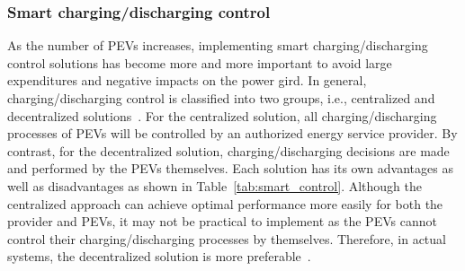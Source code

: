 \documentclass[twocolumn,10pt]{IEEEtran}
\begin{document}
\subsubsection{Smart charging/discharging control}

As the number of PEVs increases, implementing smart charging/discharging control solutions has become more and more important to avoid large expenditures and negative impacts on the power gird. In general, charging/discharging control is classified into two groups, i.e., centralized and decentralized solutions~\cite{Villalobos2014Plug}. For the centralized solution, all charging/discharging processes of PEVs will be controlled by an authorized energy service provider. By contrast, for the decentralized solution, charging/discharging decisions are made and performed by the PEVs themselves. Each solution has its own advantages as well as disadvantages as shown in Table~\ref{tab:smart_control}. Although the centralized approach can achieve optimal performance more easily for both the provider and PEVs, it may not be practical to implement as the PEVs cannot control their charging/discharging processes by themselves. Therefore, in actual systems, the decentralized solution is more preferable~\cite{Villalobos2014Plug}. 
\end{document}
